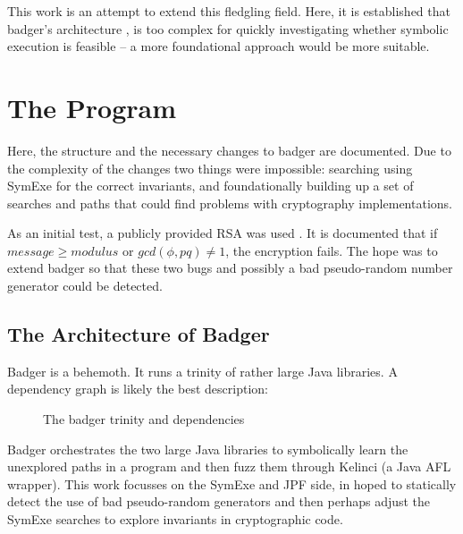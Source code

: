 \documentclass[letterpaper,twocolumn,10pt]{article}
\begin{document}
This work is an attempt to extend this fledgling field. Here, it is established that badger's
architecture \cite{badger}, is too complex for quickly investigating whether symbolic execution
is feasible -- a more foundational approach would be more suitable.

\section{The Program}

Here, the structure and the necessary changes to badger are documented. Due to the complexity
of the changes two things were impossible: searching using SymExe for the correct invariants,
and foundationally building up a set of searches and paths that could find problems with
cryptography implementations.

As an initial test, a publicly provided RSA was used \cite{RSAImpl}. It is documented
that if $message \geq modulus$ or $gcd(\phi, pq) \neq 1$, the encryption fails. The
hope was to extend badger so that these two bugs and possibly a bad pseudo-random
number generator could be detected.

\subsection{The Architecture of Badger}

Badger is a behemoth. It runs a trinity of rather large Java libraries. A dependency graph is likely the best
description:

\begin{wrapfigure}{l}{5cm}
\caption{The badger trinity and dependencies}
\end{wrapfigure}

Badger orchestrates the two large Java libraries to symbolically learn the unexplored paths in a program and
then fuzz them through Kelinci (a Java AFL wrapper). This work focusses on the SymExe and JPF side, in hoped
to statically detect the use of bad pseudo-random generators and then perhaps adjust the SymExe searches to
explore invariants in cryptographic code.
\end{document}

